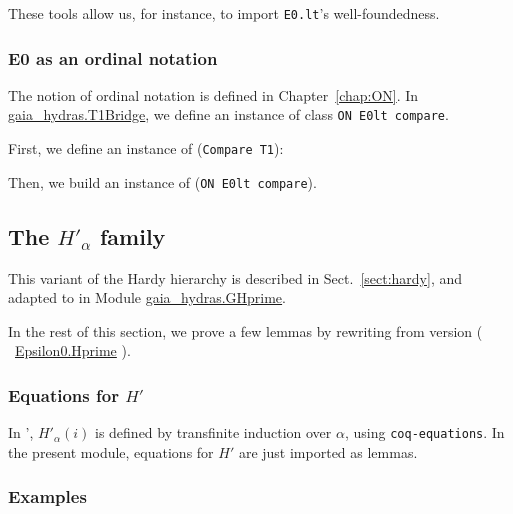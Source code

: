 These tools allow us, for instance,  to import \texttt{E0.lt}'s  well-foundedness.



\subsubsection{E0 as an ordinal notation}

The notion of ordinal notation is defined in Chapter~\ref{chap:ON}. In \href{../theories/html/gaia_hydras.T1Bridge.html}{gaia\_hydras.T1Bridge}, we define an instance of class \texttt{ON E0lt compare}.

First, we define an instance of (\texttt{Compare T1}):


Then, we build an instance of (\texttt{ON E0lt compare}).





\subsection{The \texorpdfstring{$H'_\alpha$}{H'\_alpha} family}

This variant of the Hardy hierarchy is described in Sect.~\vref{sect:hardy}, and adapted to \gaia in
Module \href{../theories/html/gaia_hydras.GHprime.html}{gaia\_hydras.GHprime}.


In the rest of this section, we prove a few lemmas  by rewriting from \HydrasLib version ( ~\href{../theories/html/hydras.Epsilon0.Hprime.html}{Epsilon0.Hprime} ).

\subsubsection{Equations for $H'$}
In \HydrasLib', $H'_\alpha(i)$  is defined by transfinite induction over $\alpha$, using \texttt{coq-equations}. In the present module, equations for $H'$ are just imported as lemmas.


\subsubsection{Examples}

